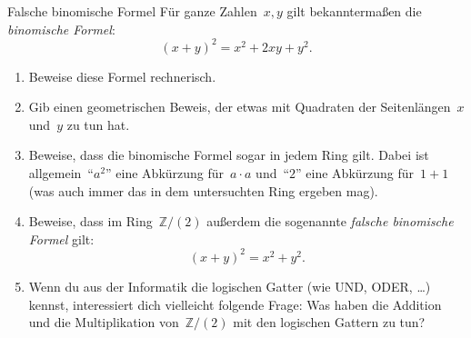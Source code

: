 \documentclass{zirkelblatt}
\newcommand{\ZZ}{\mathbb{Z}}
\begin{document}
\begin{aufgabe}{Falsche binomische Formel}
Für ganze Zahlen~$x,y$ gilt bekanntermaßen die \emph{binomische Formel}:
\[ (x+y)^2 = x^2 + 2xy + y^2. \]
\begin{enumerate}
\item Beweise diese Formel rechnerisch.
\item Gib einen geometrischen Beweis, der etwas mit Quadraten der
Seitenlängen~$x$ und~$y$ zu tun hat.
\item Beweise, dass die binomische Formel sogar in jedem Ring gilt. Dabei ist allgemein~"`$a^2$"'
eine Abkürzung für~$a \cdot a$ und~"`$2$"' eine Abkürzung für~$1 + 1$ (was auch
immer das in dem untersuchten Ring ergeben mag).
\item Beweise, dass im Ring~$\ZZ/(2)$ außerdem die sogenannte
\emph{falsche binomische Formel} gilt:
\[ (x+y)^2 = x^2 + y^2. \]
\item Wenn du aus der Informatik die logischen Gatter (wie UND, ODER, \ldots)
kennst, interessiert dich vielleicht folgende Frage: Was haben die Addition und
die Multiplikation von~$\ZZ/(2)$ mit den logischen Gattern zu tun?
\end{enumerate}
\end{aufgabe}
\end{document}
